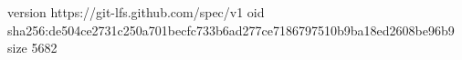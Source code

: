 version https://git-lfs.github.com/spec/v1
oid sha256:de504ce2731c250a701becfc733b6ad277ce7186797510b9ba18ed2608be96b9
size 5682
